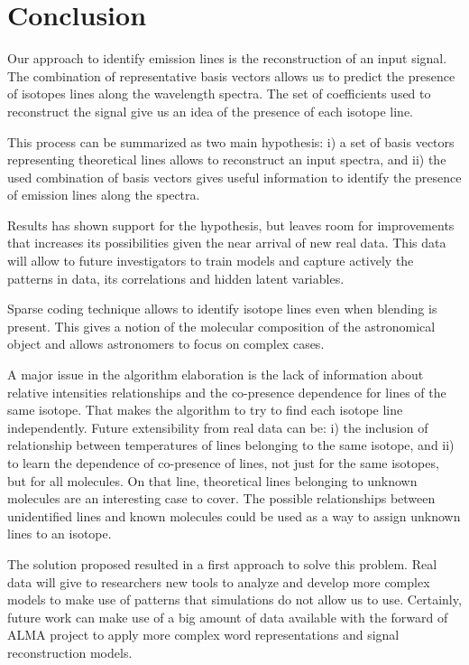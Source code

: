 \section{Conclusion} \label{sec:conclusions}

\begin{comment}
  - Remember hypothesis
  - Results support hypothesis
  - Reached objective proposed in the focus of the problem
  - With some exceptions, results archived
  - Extensibility
  - Next steps
\end{comment}

Our approach to identify emission lines is the reconstruction of an input signal.
The combination of representative basis vectors allows us to predict the presence of isotopes lines along the wavelength spectra.
The set of coefficients used to reconstruct the signal give us an idea of the presence of each isotope line.

This process can be summarized as two main hypothesis:
i) a set of basis vectors representing theoretical lines allows to reconstruct an input spectra, and
ii) the used combination of basis vectors gives useful information to identify the presence of emission lines along the spectra.

Results has shown support for the hypothesis, but leaves room for improvements that increases its possibilities given the near arrival of new real data.
This data will allow to future investigators to train models and capture actively the patterns in data, its correlations and hidden latent variables.

Sparse coding technique allows to identify isotope lines even when blending is present.
This gives a notion of the molecular composition of the astronomical object and allows astronomers to focus on complex cases.

A major issue in the algorithm elaboration is the lack of information about relative intensities relationships and the co-presence dependence for lines of the same isotope.
That makes the algorithm to try to find each isotope line independently.
Future extensibility from real data can be:
i) the inclusion of relationship between temperatures of lines belonging to the same isotope, and 
ii) to learn the dependence of co-presence of lines, not just for the same isotopes, but for all molecules.
On that line, theoretical lines belonging to unknown molecules are an interesting case to cover.
The possible relationships between unidentified lines and known molecules could be used as a way to assign unknown lines to an isotope. 

The solution proposed resulted in a first approach to solve this problem.
Real data will give to researchers new tools to analyze and develop more complex models to make use of patterns that simulations do not allow us to use.
Certainly, future work can make use of a big amount of data available with the forward of ALMA project to apply more complex word representations and signal reconstruction models.